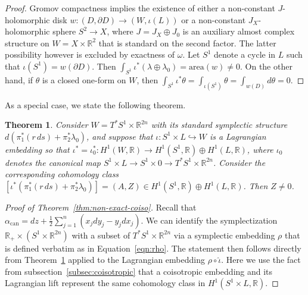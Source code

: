 \documentclass{amsart}
\newtheorem{thm}{Theorem}[section]
\theoremstyle{remark}
\def\area{{\textrm{area}}}
\def\R{{\mathbb R}}
\begin{document}
\begin{proof}
Gromov compactness \cite[Subsection~2.3.B$_{\textrm 3}$]{gromov:pcs85} implies the existence of either a non-constant $J$-holomorphic disk $w \colon (D, \partial D) \to (W, \iota (L))$ or a non-constant $J_X$-holomorphic sphere $S^2 \to X$, where $J = J_X \oplus J_0$ is an auxiliary almost complex structure on $W = X \times \R^2$ that is standard on the second factor.
The latter possibility however is excluded by exactness of $\omega$.
Let $S^1$ denote a cycle in $L$ such that $\iota (S^1) = w (\partial D)$.
Then $\int_{S^1} \iota^* (\lambda \oplus \lambda_0) = \area (w) \not= 0$.
On the other hand, if $\theta$ is a closed one-form on $W$, then $\int_{S^1} \iota^* \theta = \int_{\iota (S^1)} \theta = \int_{w (D)} d\theta = 0$.
\end{proof}

As a special case, we state the following theorem.

\begin{thm} \label{thm:non-exact-lag}
Consider $W = T^*S^1 \times \R^{2 n}$ with its standard symplectic structure $d(\pi_1^* (r \, ds) + \pi_2^* \lambda_0)$, and suppose that $\iota \colon S^1 \times L \hookrightarrow W$ is a Lagrangian embedding so that $\iota^* = \iota_0^* \colon H^1 (W, \R) \to H^1 (S^1, \R) \oplus H^1 (L, \R)$, where $\iota_0$ denotes the canonical map $S^1 \times L \to S^1 \times 0 \to T^*S^1 \times \R^{2 n}$.
Consider the corresponding cohomology class $[\iota^* (\pi_1^* (r \, ds) + \pi_2^* \lambda_0)] = (A, Z) \in H^1 (S^1, \R) \oplus H^1 (L, \R)$.
Then $Z \not= 0$.
\end{thm}

\begin{proof}[Proof of Theorem~\ref{thm:non-exact-coiso}]
Recall that $\alpha_{\textrm{can}} = dz + \frac{1}{2} \sum_{j = 1}^n (x_j dy_j - y_j dx_j)$.
We can identify the symplectization $\R_+ \times (S^1 \times \R^{2 n})$ with a subset of $T^* S^1 \times \R^{2 n}$ via a symplectic embedding $\rho$ that is defined verbatim as in Equation~\ref{eqn:rho}.
The statement then follows directly from Theorem~\ref{thm:non-exact-lag} applied to the Lagrangian embedding $\rho \circ \hat{\iota}$.
Here we use the fact from subsection~\ref{subsec:coisotropic} that a coisotropic embedding and its Lagrangian lift represent the same cohomology class in $H^1 (S^1 \times L, \R)$.
\end{proof}



\end{document}
